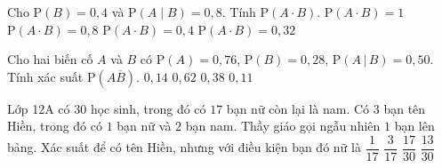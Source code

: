 \begin{ex}%
	Cho $\mathrm{P}(B) = 0{,}4$ và $\mathrm{P}(A\mid B) = 0{,}8$. Tính  $\mathrm{P}(A\cdot B)$.
	\choice 
		{$\mathrm{P}(A\cdot B) = 1$} 
		{$\mathrm{P}(A\cdot B) =  0{,}8$}
		 {$\mathrm{P}(A\cdot B) = 0{,}4$}
		{\True $\mathrm{P}(A\cdot B) = 0{,}32$} 
\end{ex}

\begin{ex}%
	Cho hai biến cố $A$ và $B$ có $\mathrm{P}(A) = 0{,}76$, $\mathrm{P}(B) = 0{,}28$,  $\mathrm{P}(A\,|\,B) = 0{,}50$. Tính xác suất $\mathrm{P}(A\overline{B})$.
	\choice 
		 {$0{,}14$}
		{\True $0{,}62$} 
		{$0{,}38$} 
		{$0{,}11$} 
\end{ex}

\begin{ex}%
	Lớp 12A có $30$ học sinh, trong đó có $17$ bạn nữ còn lại là nam. Có  $3$ bạn tên Hiền, trong đó có $1$ bạn nữ và $2$ bạn nam. Thầy giáo gọi ngẫu nhiên $1$ bạn lên bảng. Xác suất để có tên Hiền, nhưng với điều kiện bạn đó nữ là
	\choice 
		{\True  $\dfrac{1}{17}$}
		 {$\dfrac{3}{17}$}
		 {$\dfrac{17}{30}$}
		 {$\dfrac{13}{30}$}
\end{ex}

